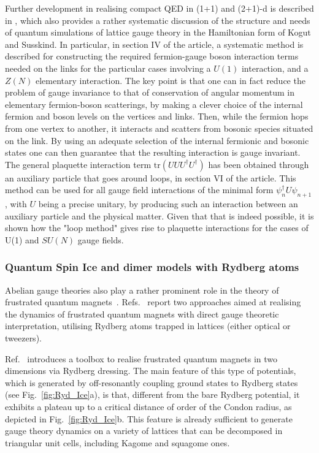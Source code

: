 \documentclass[epj,final]{svjour}
\begin{document}
Further development in realising compact QED in (1+1) and (2+1)-d is described in \cite{zohar2013quantum}, which also provides a rather systematic discussion of the structure and needs of quantum simulations of lattice gauge theory in the Hamiltonian form of Kogut and Susskind. In particular, in section IV of the article, a systematic method is described for constructing the required fermion-gauge boson interaction terms needed on the links for the particular cases involving a $U(1)$ interaction, and  a $Z(N)$ elementary interaction. The key point is that one can in fact reduce the problem of gauge invariance to that of conservation of angular momentum in elementary fermion-boson scatterings, by making a clever choice of the internal fermion and boson levels on the vertices and links. Then, while the fermion hops from one vertex to another, it interacts and scatters from bosonic species situated on the link.  By using an adequate selection of the internal fermionic and bosonic states one can then guarantee that the resulting interaction is gauge invariant. The general plaquette interaction term $\text{tr}(UUU^\dagger U^\dagger)$ has been obtained through an auxiliary particle that goes around loops, in section VI of the article. This method can be used for all gauge field interactions of the minimal form $\psi^\dagger_n U\psi_{n+1}$, with $U$ being a precise unitary, by producing such an interaction between an auxiliary particle and the physical matter. Given that that is indeed possible, it is shown how the "loop method" gives rise to plaquette interactions for the cases of U(1) and $SU(N)$ gauge fields.

\subsubsection{Quantum Spin Ice and dimer models with Rydberg atoms\cite{glaetzle2014quantum}}

Abelian gauge theories also play a rather prominent role in the theory of frustrated quantum magnets~\cite{Lacroix2010}. Refs.~\cite{glaetzle2014quantum,glaetzle2015designing} report two approaches aimed at realising the dynamics of frustrated quantum magnets with direct gauge theoretic interpretation, utilising Rydberg atoms trapped in lattices (either optical or tweezers).

Ref.~\cite{glaetzle2014quantum} introduces a toolbox to realise frustrated quantum magnets in two dimensions via Rydberg dressing. The main feature of this type of potentials, which is generated by off-resonantly coupling ground states to Rydberg states (see Fig.~\ref{fig:Ryd_Ice}a), is that, different from the bare Rydberg potential, it exhibits a plateau up to a critical distance of order of the Condon radius, as depicted in Fig.~\ref{fig:Ryd_Ice}b. This feature is already sufficient to generate gauge theory dynamics on a variety of lattices that can be decomposed in triangular unit cells, including Kagome and squagome ones. 
\end{document}
